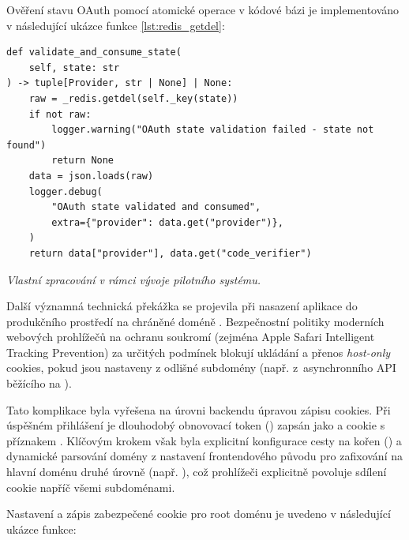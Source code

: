 \documentclass[male,czech,api_bc]{kitheses}
\newcommand{\zdroj}[1]{%
    \vspace{1ex}%
    {\footnotesize \raggedright \textit{#1}\par}%
}
\begin{document}
Ověření stavu OAuth pomocí atomické operace v kódové bázi je implementováno v následující ukázce funkce \vref{lst:redis_getdel}:

\begin{listing}[htbp]
\begin{verbatim}
def validate_and_consume_state(
    self, state: str
) -> tuple[Provider, str | None] | None:
    raw = _redis.getdel(self._key(state))
    if not raw:
        logger.warning("OAuth state validation failed - state not found")
        return None
    data = json.loads(raw)
    logger.debug(
        "OAuth state validated and consumed",
        extra={"provider": data.get("provider")},
    )
    return data["provider"], data.get("code_verifier")
\end{verbatim}
\caption{Ověření a konzumace jednorázového stavu OAuth v paměti Redis}
\label{lst:redis_getdel}
\zdroj{Vlastní zpracování v rámci vývoje pilotního systému.}
\end{listing}

Další významná technická překážka se projevila při nasazení aplikace do produkčního prostředí na chráněné doméně . Bezpečnostní politiky moderních webových prohlížečů na ochranu soukromí (zejména Apple Safari Intelligent Tracking Prevention) za určitých podmínek blokují ukládání a přenos \textit{host-only} cookies, pokud jsou nastaveny z odlišné subdomény (např. z~asynchronního API běžícího na ).

Tato komplikace byla vyřešena na úrovni backendu úpravou zápisu cookies. Při úspěšném přihlášení je dlouhodobý obnovovací token () zapsán jako  a  cookie s příznakem . Klíčovým krokem však byla explicitní konfigurace cesty na kořen () a dynamické parsování domény z nastavení frontendového původu pro zafixování na hlavní doménu druhé úrovně (např. ), což prohlížeči explicitně povoluje sdílení cookie napříč všemi subdoménami.

Nastavení a zápis zabezpečené cookie pro root doménu je uvedeno v následující ukázce funkce:
\end{document}
